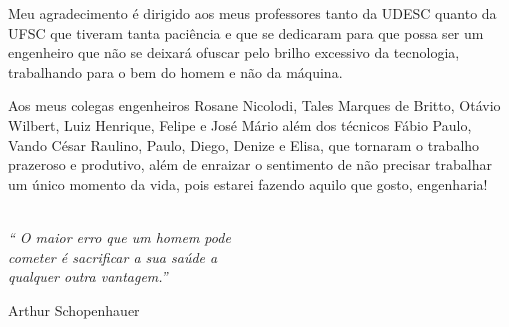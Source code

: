 \documentclass[a5paper]{ufsc-thesis}
\begin{document}
\begin{agradecimentos}
Meu agradecimento é dirigido aos meus professores tanto da UDESC quanto da UFSC que tiveram tanta paciência e que se dedicaram para que possa ser um engenheiro que não se deixará ofuscar pelo brilho excessivo da tecnologia, trabalhando para o bem do homem e não da máquina.\par
Aos meus colegas engenheiros Rosane Nicolodi, Tales Marques de Britto, Otávio Wilbert, Luiz Henrique, Felipe e José Mário além dos técnicos Fábio Paulo, Vando César Raulino, Paulo, Diego, Denize e Elisa, que tornaram o trabalho prazeroso e produtivo, além de enraizar o sentimento de não precisar trabalhar um único momento da vida, pois estarei fazendo aquilo que gosto, engenharia!
\end{agradecimentos}

\begin{epigrafe}
    \vspace*{\fill}
		\noindent
		\hangindent=5cm \\
		\textit{`` O maior erro que um homem pode \\
		cometer é sacrificar a sua saúde a \\
		qualquer outra vantagem.''}
		\begin{flushright}
		Arthur Schopenhauer	
		\end{flushright}		
\end{epigrafe}





 


\listoffigures
\cleardoublepage
\end{document}
